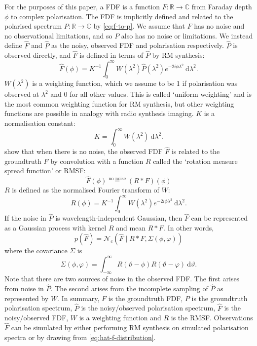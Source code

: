   For the purposes of this paper, a FDF is a function $F : \mathbb R \to \mathbb C$ from Faraday depth $\phi$ to complex polarisation. The FDF is implicitly defined and related to the polarised spectrum $P : \mathbb R \to \mathbb C$ by \autoref{eq:f-to-p}. We assume that $F$ has no noise and no observational limitations, and so $P$ also has no noise or limitations. We instead define $\hat F$ and $\hat P$ as the noisy, observed FDF and polarisation respectively. $\hat P$ is observed directly, and $\hat F$ is defined in terms of $\hat P$ by RM synthesis:
  \begin{equation}
      \label{eq:rm-synthesis}
      \hat F(\phi) = K^{-1} \int_{0}^{\infty} W(\lambda^2) \hat P(\lambda^2) e^{-2i\phi\lambda^2}\ \mathrm{d}\lambda^2.
  \end{equation}
  $W(\lambda^2)$ is a weighting function, which we assume to be 1 if polarisation was observed at $\lambda^2$ and 0 for all other values. This is called `uniform weighting' and is the most common weighting function for RM synthesis, but other weighting functions are possible in analogy with radio synthesis imaging. $K$ is a normalisation constant:
  \begin{equation}
    \label{eq:k}
    K = \int_{0}^\infty W(\lambda^2)\ \mathrm{d}\lambda^2.
  \end{equation}
  \citet{brentjens_faraday_2005} show that when there is no noise, the observed FDF $\hat F$ is related to the groundtruth $F$ by convolution with a function $R$ called the `rotation measure spread function' or RMSF:
  \begin{equation}
    \label{eq:hat-f-r-ast-f}
    \hat F(\phi) \overset{\text{no noise}}{=} (R \ast F)(\phi)
  \end{equation}
  $R$ is defined as the normalised Fourier transform of $W$:
  \begin{equation}
    \label{eq:rmsf}
    R(\phi) = K^{-1} \int_{0}^{\infty} W(\lambda^2) e^{-2i\phi\lambda^2}\ \mathrm{d}{\lambda^2}.
  \end{equation}
  If the noise in $\hat P$ is wavelength-independent Gaussian, then $\hat F$ can be represented as a Gaussian process with kernel $R$ and mean $R \ast F$. In other words,
  \begin{equation}
    \label{eq:hat-f-distribution}
    p(\hat F) = \mathcal N_c(\hat F \mid R \ast F, \Sigma(\phi, \varphi))
  \end{equation}
  where the covariance $\Sigma$ is
  \begin{equation}
    \Sigma(\phi, \varphi) = \int_{-\infty}^\infty R(\vartheta - \phi) R(\vartheta - \varphi)\ \mathrm{d}\vartheta.
  \end{equation}
  Note that there are two sources of noise in the observed FDF. The first arises from noise in $\hat P$. The second arises from the incomplete sampling of $\hat P$ as represented by $W$. In summary, $F$ is the groundtruth FDF, $P$ is the groundtruth polarisation spectrum, $\hat P$ is the noisy/observed polarisation spectrum, $\hat F$ is the noisy/observed FDF, $W$ is a weighting function and $R$ is the RMSF. Observations $\hat F$ can be simulated by either performing RM synthesis on simulated polarisation spectra or by drawing from \autoref{eq:hat-f-distribution}.

